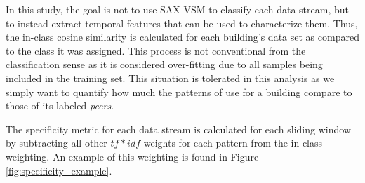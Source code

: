In this study, the goal is not to use SAX-VSM to classify each data stream, but to instead extract temporal features that can be used to characterize them. Thus, the in-class cosine similarity is calculated for each building's data set as compared to the class it was assigned. This process is not conventional from the classification sense as it is considered over-fitting due to all samples being included in the training set. This situation is tolerated in this analysis as we simply want to quantify how much the patterns of use for a building compare to those of its labeled \emph{peers}.

The specificity metric for each data stream is calculated for each sliding window by subtracting all other $tf*idf$ weights for each pattern from the in-class weighting. An example of this weighting is found in Figure \ref{fig:specificity_example}.